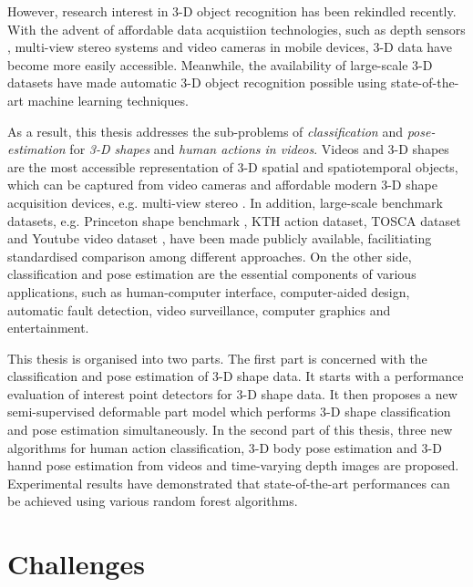 However, research interest in 3-D object recognition has been rekindled recently. 
With the advent of affordable data acquistiion technologies, such as depth sensors \cite{Shotton2011}, multi-view stereo systems \cite{Vogiatzis2011} and video cameras in mobile devices, 3-D data have become more easily accessible. Meanwhile, the availability of large-scale 3-D datasets have made automatic 3-D object recognition possible using state-of-the-art machine learning techniques.  

As a result, this thesis addresses the sub-problems of \emph{classification} and \emph{pose-estimation} for \emph{3-D shapes} and \emph{human actions in videos}. 
Videos and 3-D shapes are the most accessible representation of 3-D spatial and spatiotemporal objects, which can be captured from video cameras and affordable modern 3-D shape acquisition devices, e.g. multi-view stereo \cite{Vogiatzis2011}. 
In addition, large-scale benchmark datasets, e.g. Princeton shape benchmark \cite{Shilane2004},  KTH action dataset\cite{Schuldt2004}, TOSCA dataset \cite{Bronstein2011} and Youtube video dataset \cite{Liu2009}, have been made publicly available, facilitiating standardised comparison among different approaches. 
On the other side, classification and pose estimation are the essential components of various applications, such as human-computer interface, computer-aided design, automatic fault detection, video surveillance, computer graphics and entertainment. 

This thesis is organised into two parts.  
The first part is concerned with the classification and pose estimation of 3-D shape data. It starts with a performance evaluation of interest point detectors for 3-D shape data. It then proposes a new semi-supervised deformable part model which performs 3-D shape classification and pose estimation simultaneously. In the second part of this thesis, three new algorithms for human action classification, 3-D body pose estimation and 3-D hannd pose estimation from videos and time-varying depth images are proposed. Experimental results have demonstrated that state-of-the-art performances can be achieved using various random forest algorithms.    

\section{Challenges}

